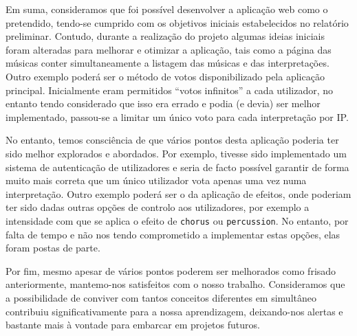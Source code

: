 \documentclass[a4paper,11pt,openright,oneside]{report}
\begin{document}
Em suma, consideramos que foi possível desenvolver a aplicação web como o pretendido, tendo-se cumprido com os objetivos iniciais estabelecidos no relatório preliminar. Contudo, durante a realização do projeto algumas ideias iniciais foram alteradas para melhorar e otimizar a aplicação, tais como a página das músicas conter simultaneamente a listagem das músicas e das interpretações. Outro exemplo poderá ser o método de votos disponibilizado pela aplicação principal. Inicialmente eram permitidos ``votos infinitos'' a cada utilizador, no entanto tendo considerado que isso era errado e podia (e devia) ser melhor implementado, passou-se a limitar um único voto para cada interpretação por IP.

No entanto, temos consciência de que vários pontos desta aplicação poderia ter sido melhor explorados e abordados. Por exemplo, tivesse sido implementado um sistema de autenticação de utilizadores e seria de facto possível garantir de forma muito mais correta que um único utilizador vota apenas uma vez numa interpretação. Outro exemplo poderá ser o da aplicação de efeitos, onde poderiam ter sido dadas outras opções de controlo aos utilizadores, por exemplo a intensidade com que se aplica o efeito de \verb|chorus| ou \verb|percussion|. No entanto, por falta de tempo e não nos tendo comprometido a implementar estas opções, elas foram postas de parte.

Por fim, mesmo apesar de vários pontos poderem ser melhorados como frisado anteriormente, mantemo-nos satisfeitos com o nosso trabalho. Consideramos que a possibilidade de conviver com tantos conceitos diferentes em simultâneo contribuiu significativamente para a nossa aprendizagem, deixando-nos alertas e bastante mais à vontade para embarcar em projetos futuros.

\maketitle
\nocite{*}
\printbibliography[title={Referências}]
\end{document}
